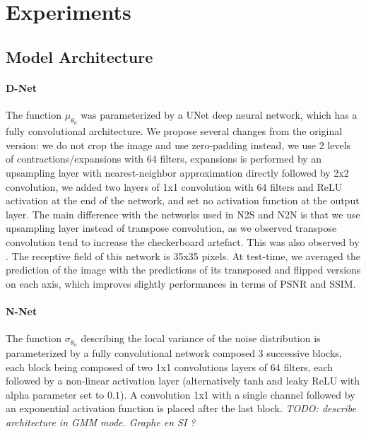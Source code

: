 \documentclass{article}
\begin{document}
\section{Experiments}
\label{sec:experiments}
\subsection{Model Architecture}
\paragraph{D-Net}
The function $\mu_{\theta_d}$ was parameterized by a UNet \cite{ronneberger2015u} deep neural network, which has a fully convolutional architecture.
We propose several changes from the original version: we do not crop the image and use zero-padding instead, we use 2 levels of contractions/expansions with 64 filters, expansions is performed by an upsampling layer with nearest-neighbor approximation directly followed by 2x2 convolution, we added two layers of 1x1 convolution with 64 filters and ReLU activation at the end of the network, and set no activation function at the output layer.
The main difference with the networks used in N2S and N2N is that we use upsampling layer instead of transpose convolution, as we observed transpose convolution tend to increase the checkerboard artefact. This was also observed by \cite{kobayashi2020image}.
The receptive field of this network is 35x35 pixels.
At test-time, we averaged the prediction of the image with the predictions of its transposed and flipped versions on each axis, which improves slightly performances in terms of PSNR and SSIM.


\paragraph{N-Net}
The function $\sigma_{\theta_n}$ describing the local variance of the noise distribution is parameterized by a fully convolutional network composed 3 successive blocks, each block being composed of two 1x1 convolutions layers of 64 filters, each followed by a non-linear activation layer (alternatively tanh and leaky ReLU with alpha parameter set to $0.1$).
A convolution 1x1 with a single channel followed by an exponential activation function is placed after the last block.
\textit{TODO: describe architecture in GMM mode. Graphe en SI ? }
\end{document}
